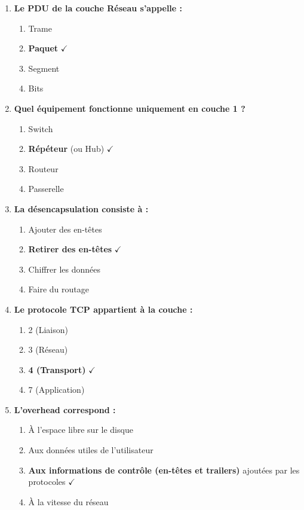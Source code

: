 \documentclass[11pt, a4paper]{article}
\begin{document}
\begin{enumerate}[label=\arabic*.]
    \item \textbf{Le PDU de la couche Réseau s'appelle :}
    \begin{enumerate}[label=\Alph*.]
        \item Trame
        \item[\textbf{B.}] \textbf{Paquet} $\checkmark$
        \item Segment
        \item Bits
    \end{enumerate}

    \item \textbf{Quel équipement fonctionne uniquement en couche 1 ?}
    \begin{enumerate}[label=\Alph*.]
        \item Switch
        \item[\textbf{B.}] \textbf{Répéteur} (ou Hub) $\checkmark$
        \item Routeur
        \item Passerelle
    \end{enumerate}

    \item \textbf{La désencapsulation consiste à :}
    \begin{enumerate}[label=\Alph*.]
        \item Ajouter des en-têtes
        \item[\textbf{B.}] \textbf{Retirer des en-têtes} $\checkmark$
        \item Chiffrer les données
        \item Faire du routage
    \end{enumerate}

    \item \textbf{Le protocole TCP appartient à la couche :}
    \begin{enumerate}[label=\Alph*.]
        \item 2 (Liaison)
        \item 3 (Réseau)
        \item[\textbf{C.}] \textbf{4 (Transport)} $\checkmark$
        \item 7 (Application)
    \end{enumerate}

    \item \textbf{L'overhead correspond :}
    \begin{enumerate}[label=\Alph*.]
        \item À l'espace libre sur le disque
        \item Aux données utiles de l'utilisateur
        \item[\textbf{C.}] \textbf{Aux informations de contrôle (en-têtes et trailers)} ajoutées par les protocoles $\checkmark$
        \item À la vitesse du réseau
    \end{enumerate}
\end{enumerate}
\end{document}
